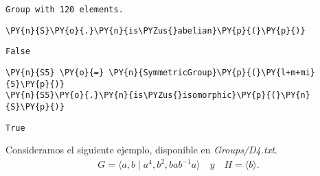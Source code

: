 \begin{enumerate}
    \begin{Verbatim}[commandchars=\\\{\}]
Group with 120 elements.
    \end{Verbatim}

    \begin{tcolorbox}[breakable, size=fbox, boxrule=1pt, pad at break*=1mm,colback=cellbackground, colframe=cellborder]
\begin{Verbatim}[commandchars=\\\{\}]
\PY{n}{S}\PY{o}{.}\PY{n}{is\PYZus{}abelian}\PY{p}{(}\PY{p}{)}
\end{Verbatim}
\end{tcolorbox}

            \begin{tcolorbox}[breakable, size=fbox, boxrule=.5pt, pad at break*=1mm, opacityfill=0]
\begin{Verbatim}[commandchars=\\\{\}]
False
\end{Verbatim}
\end{tcolorbox}
        
    \begin{tcolorbox}[breakable, size=fbox, boxrule=1pt, pad at break*=1mm,colback=cellbackground, colframe=cellborder]
\begin{Verbatim}[commandchars=\\\{\}]
\PY{n}{S5} \PY{o}{=} \PY{n}{SymmetricGroup}\PY{p}{(}\PY{l+m+mi}{5}\PY{p}{)}
\PY{n}{S5}\PY{o}{.}\PY{n}{is\PYZus{}isomorphic}\PY{p}{(}\PY{n}{S}\PY{p}{)}
\end{Verbatim}
\end{tcolorbox}


            \begin{tcolorbox}[breakable, size=fbox, boxrule=.5pt, pad at break*=1mm, opacityfill=0]
\begin{Verbatim}[commandchars=\\\{\}]
True
\end{Verbatim}
\end{tcolorbox}
        
    

\end{enumerate}
\fi

\newpage

Consideramos el siguiente ejemplo, disponible en \textit{Groups/D4.txt}.
\begin{align*}
    G = \langle a,b \; | \; a^4, b^2, bab^{-1}a \rangle \quad  y \quad H=\langle b \rangle.
\end{align*}

